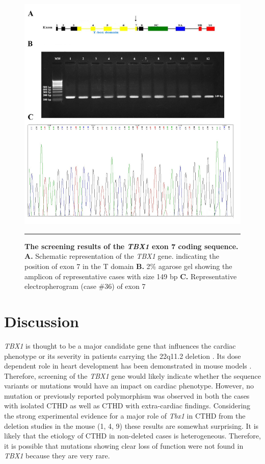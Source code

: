 \begin{refsection}
\begin{figure}[!tb]
\centering
\includegraphics[width=\linewidth]{Figures/Figure4_9TBX7.pdf}
\rule{35em}{0.5pt}
\caption[The screening results of the \textit{TBX1} exon 7 coding sequence]{\textbf{The screening results of the \textit{TBX1} exon 7 coding sequence.}
\textbf{A.} Schematic representation of the \textit{TBX1} gene. indicating the position of exon 7 in the T domain \textbf{B.} 2\% agarose gel showing the amplicon of representative cases with size 149 bp \textbf{C.} Representative electropherogram (case \#36) of exon 7}
\label{fig:4_9}
\end{figure}



\section{Discussion}


\textit{TBX1} is thought to be a major candidate gene that influences the cardiac phenotype or its severity in patients carrying the 22q11.2 deletion \cite{gong2001mutation}. Its dose dependent role in heart development has been demonstrated in mouse models \cite{chieffo1997isolation, lindsay1999congenital, lindsay2001tbx1}. Therefore, screening of the \textit{TBX1} gene would likely indicate whether the sequence variants or mutations would have an impact on cardiac phenotype. However, no mutation or previously reported polymorphism was observed in both the cases with isolated CTHD as well as CTHD with extra-cardiac findings. Considering the strong experimental evidence for a major role of \textit{Tbx1} in CTHD from the deletion studies in the mouse (1, 4, 9) these results are somewhat surprising. It is likely that the etiology of CTHD in non-deleted cases is heterogeneous. Therefore, it is possible that mutations showing clear loss of function were not found in \textit{TBX1} because they are very rare.


\end{refsection}
